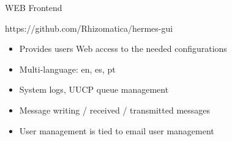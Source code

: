 \documentclass[aspectratio=169,xcolor={x11names,svgnames,dvipsnames}]{beamer}
\begin{document}
\begin{frame}{WEB Frontend}

\begin{block}{https://github.com/Rhizomatica/hermes-gui}
  \begin{itemize}
  \item Provides users Web access to the needed configurations
  \item Multi-language: en, es, pt
  \item System logs, UUCP queue management
  \item Message writing / received / transmitted messages
  \item User management is tied to email user management
  \end{itemize}
\end{block}

\end{frame}
\end{document}
